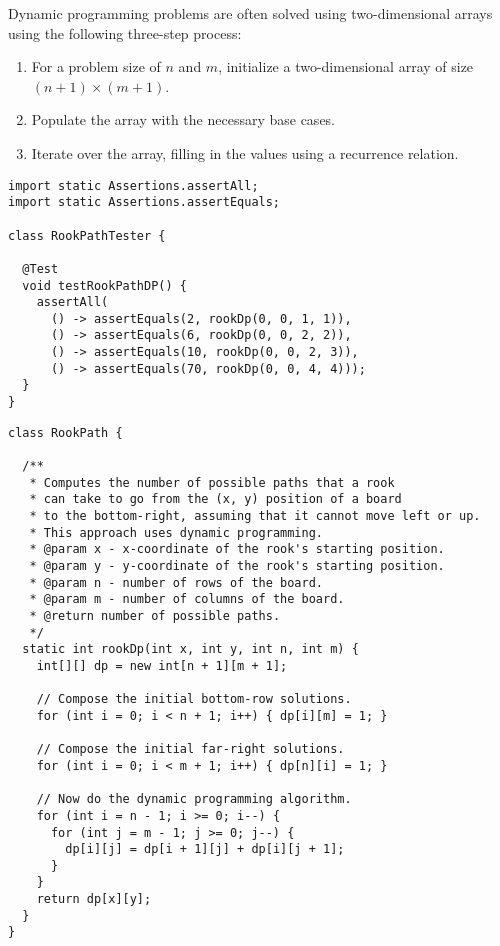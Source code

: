 Dynamic programming problems are often solved using two-dimensional arrays using the following three-step process: 

\begin{enumerate}
  \item For a problem size of $n$ and $m$, initialize a two-dimensional array of size $(n + 1) \times (m + 1)$.
  \item Populate the array with the necessary base cases.
  \item Iterate over the array, filling in the values using a recurrence relation.
\end{enumerate}

\begin{lstlisting}[language=MyJava]
import static Assertions.assertAll;
import static Assertions.assertEquals;

class RookPathTester {

  @Test
  void testRookPathDP() {
    assertAll(
      () -> assertEquals(2, rookDp(0, 0, 1, 1)),
      () -> assertEquals(6, rookDp(0, 0, 2, 2)),
      () -> assertEquals(10, rookDp(0, 0, 2, 3)),
      () -> assertEquals(70, rookDp(0, 0, 4, 4)));
  }
}
\end{lstlisting}

\begin{lstlisting}[language=MyJava]
class RookPath {

  /**
   * Computes the number of possible paths that a rook 
   * can take to go from the (x, y) position of a board 
   * to the bottom-right, assuming that it cannot move left or up. 
   * This approach uses dynamic programming.
   * @param x - x-coordinate of the rook's starting position.
   * @param y - y-coordinate of the rook's starting position.
   * @param n - number of rows of the board.
   * @param m - number of columns of the board.
   * @return number of possible paths.
   */
  static int rookDp(int x, int y, int n, int m) {
    int[][] dp = new int[n + 1][m + 1];

    // Compose the initial bottom-row solutions.
    for (int i = 0; i < n + 1; i++) { dp[i][m] = 1; }

    // Compose the initial far-right solutions.
    for (int i = 0; i < m + 1; i++) { dp[n][i] = 1; }

    // Now do the dynamic programming algorithm.
    for (int i = n - 1; i >= 0; i--) {
      for (int j = m - 1; j >= 0; j--) {
        dp[i][j] = dp[i + 1][j] + dp[i][j + 1];
      }
    }
    return dp[x][y];
  }
}
\end{lstlisting}